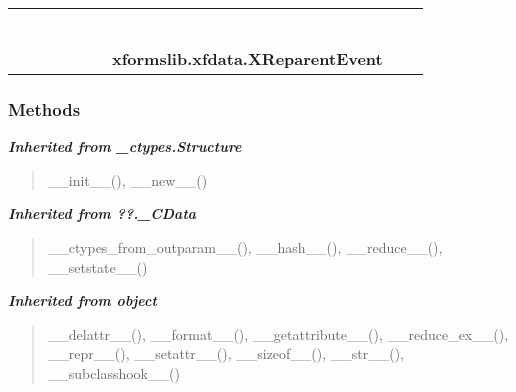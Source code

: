    \label{xformslib:xfdata:XReparentEvent}
\begin{tabular}{cccccccccc}
\multicolumn{2}{r}{\settowidth{\BCL}{object}\multirow{2}{\BCL}{object}}
&&
&&
&&
  \\\cline{3-3}
  &&\multicolumn{1}{c|}{}
&&
&&
&&
  \\
\multicolumn{4}{r}{\settowidth{\BCL}{??.\_CData}\multirow{2}{\BCL}{??.\_CData}}
&&
&&
  \\\cline{5-5}
  &&&&\multicolumn{1}{c|}{}
&&
&&
  \\
\multicolumn{6}{r}{\settowidth{\BCL}{\_ctypes.Structure}\multirow{2}{\BCL}{\_ctypes.Structure}}
&&
  \\\cline{7-7}
  &&&&&&\multicolumn{1}{c|}{}
&&
  \\
&&&&&&\multicolumn{2}{l}{\textbf{xformslib.xfdata.XReparentEvent}}
\end{tabular}



  \subsubsection{Methods}


\large{\textbf{\textit{Inherited from \_ctypes.Structure}}}

\begin{quote}
\_\_init\_\_(), \_\_new\_\_()
\end{quote}

\large{\textbf{\textit{Inherited from ??.\_CData}}}

\begin{quote}
\_\_ctypes\_from\_outparam\_\_(), \_\_hash\_\_(), \_\_reduce\_\_(), \_\_setstate\_\_()
\end{quote}

\large{\textbf{\textit{Inherited from object}}}

\begin{quote}
\_\_delattr\_\_(), \_\_format\_\_(), \_\_getattribute\_\_(), \_\_reduce\_ex\_\_(), \_\_repr\_\_(), \_\_setattr\_\_(), \_\_sizeof\_\_(), \_\_str\_\_(), \_\_subclasshook\_\_()
\end{quote}

